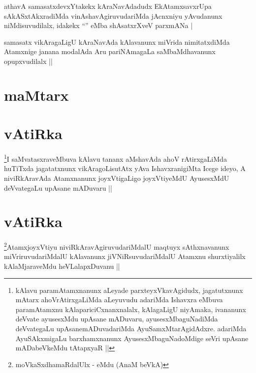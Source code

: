 

\begin{artha}
athavA samasatxdevxYtakekx kAraNavAdadudx EkAtamxsavxrUpa
sAkASxtAkxradiMda vinAshavAgiruvudariMda jAcnxniyu yAvudanunx
niMdisuvudilalx, idakekx ``\stext'' eMba shAsatxrXveV parxmANa |
\end{artha}


\begin{artha}
samasatx vikAragaLigU kAraNavAda kAlavanunx miVrida nimitatxdiMda
Atamxnige janana modalAda Aru pariNAmagaLa saMbaMdhavanunx
opupxvudilalx ||
\end{artha}


\section*{maMtarx}

\section*{vAtiRka}

\begin{artha}
\footnote{kAlavu paramAtamxnanunx aLeyade parxteyxVkavAgidudx,
  jagatutxnunx mAtarx ahoVrAtirxgaLiMda aLeyuvudu adariMda Ishavxra
  eMbuva paramAtamxnu kAlapariciCxnanxnalalx, kAlagaLigU niyAmaka,
  ivananunx deVvate ayusesxMdu upAsane mADuvaru, ayusesxMbaguNadiMda
  deVvategaLu upAsanemADuvadariMda AyuSamxMtarAgidAdxre. adariMda
  AyuSAkxmigaLu barxhamxnanunx AyusesxMbaguNadoMdige seVri upAsane
  mADabeVkeMdu tAtapxyaR  ||}I saMvatasxraveMbuva kAlavu tananx aMshavAda ahoV
rAtirxgaLiMda huTiTxda jagatatxnunx vikAragoLisutAtx yAva
IshavxranigiMta Icege ideyo, A niviRkAravAda Atamxnanunx joyxVtigaLigo
joyxVtiyeMdU AyusesxMdU deVvategaLu upAsane mADuvaru ||
\end{artha}

\section*{vAtiRka}


\begin{artha}
\footnote{\stext moVkaSxdhamaRdalUlx - \stext eMdu (AnaM beVkA)}AtamxjoyxVtiyu niviRkAravAgiruvudariMdalU maqtuyx
sAthxnavanunx miVriruvudariMdalU kAlavanunx jiVNiRsuvudariMdalU
Atamxnu shurxtiyalilx kAlaMjaraveMdu heVLalapxDuvanu ||
\end{artha}

